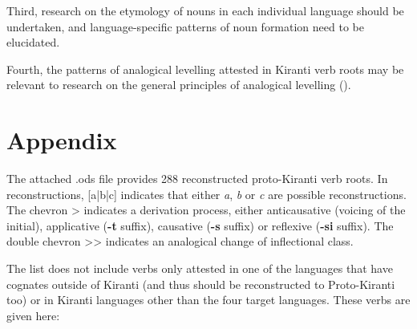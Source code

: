 \documentclass[oldfontcommands,oneside,a4paper,11pt]{article}
\newcommand{\ipa}[1]{\textbf{{\phon\mbox{#1}}}} %
\begin{document}
Third, research on the etymology of nouns in each individual language should be undertaken, and language-specific patterns of noun formation need to be elucidated.


Fourth, the patterns of analogical levelling attested in Kiranti verb roots may be relevant to research on the general principles of analogical levelling (\citealt{hill07ausgleich, hill14conditioned,jacques16ebde}).


\section{Appendix} \label{sec:appendix}
The attached .ods file provides 288 reconstructed proto-Kiranti verb roots. In reconstructions, [a|b|c] indicates that either \textit{a}, \textit{b} or \textit{c} are possible reconstructions. The chevron > indicates a derivation process, either anticausative (voicing of the initial), applicative (\ipa{-t} suffix), causative (\ipa{-s} suffix) or reflexive (\ipa{-si} suffix). The double chevron {>}{>} indicates an analogical change of inflectional class.

The list does not include verbs only attested in one of the languages that have cognates outside of Kiranti (and thus should be reconstructed to Proto-Kiranti too) or in Kiranti languages other than the four target languages. These verbs are given here:
\end{document}
